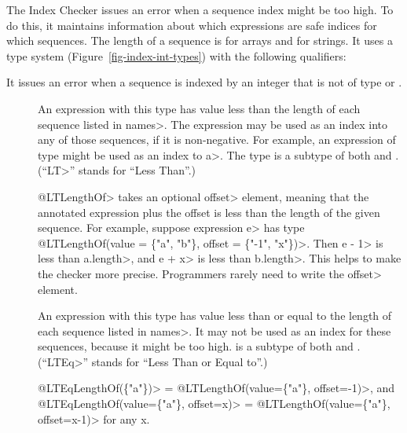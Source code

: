 
The Index Checker issues an error when a sequence index might be
too high. To do this, it maintains information about which expressions are
safe indices for which sequences.
The length of a sequence is  for arrays and
 for strings.
It uses a type system (Figure~\ref{fig-index-int-types}) with the following
qualifiers:

It issues an error when a sequence 
is indexed by an integer that is not of type 
or .

\begin{description}

\item[]
  An expression with this type
  has value less than the length of each sequence listed in \<names>.
  The expression may be used as an index into any of those sequences,
  if it is non-negative.
  For example, an expression of type  might be
  used as an index to \<a>.
  The type  is a subtype of both
   and .
  (``\<LT>'' stands for ``Less Than''.)

  \<@LTLengthOf> takes an optional \<offset> element, meaning that the
  annotated expression plus the offset is less than the length of the given
  sequence.  For example, suppose expression \<e> has type \<@LTLengthOf(value
  = \{"a", "b"\}, offset = \{"-1", "x"\})>. Then \<e - 1> is less than
  \<a.length>, and \<e + x> is less than \<b.length>.  This helps to make
  the checker more precise.  Programmers rarely need to write the \<offset>
  element.

\item[]
  An expression with this type
  has value less than or equal to the length of each sequence listed in \<names>.
  It may not be used as an index for these sequences, because it might be too high.
   is a subtype of both
   and .
  (``\<LTEq>'' stands for ``Less Than or Equal to''.)

  \<@LTEqLengthOf(\{"a"\})> = \<@LTLengthOf(value=\{"a"\}, offset=-1)>, and \\
  \<@LTEqLengthOf(value=\{"a"\}, offset=x)> = \<@LTLengthOf(value=\{"a"\},
  offset=x-1)> for any x.


\end{description}
